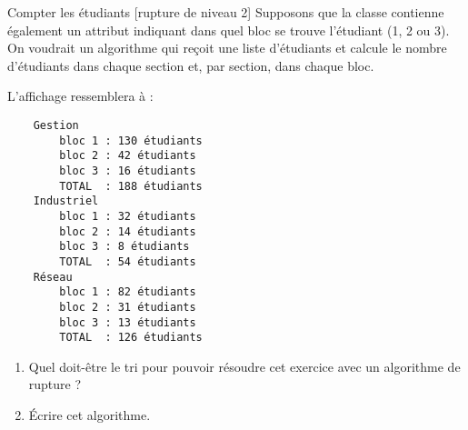 \begin{Exercice}{Compter les étudiants [rupture de niveau 2]}
	Supposons que la classe  contienne également
	un attribut indiquant dans quel bloc se trouve l'étudiant (1, 2 ou 3).
	On voudrait un algorithme qui reçoit une liste d'étudiants et calcule
	le nombre d'étudiants dans chaque section et, par section, dans chaque bloc.
	
	L'affichage ressemblera à :
	{\footnotesize
	\begin{verbatim}
    Gestion
        bloc 1 : 130 étudiants
        bloc 2 : 42 étudiants
        bloc 3 : 16 étudiants
        TOTAL  : 188 étudiants
    Industriel
        bloc 1 : 32 étudiants
        bloc 2 : 14 étudiants
        bloc 3 : 8 étudiants
        TOTAL  : 54 étudiants
    Réseau
        bloc 1 : 82 étudiants
        bloc 2 : 31 étudiants
        bloc 3 : 13 étudiants
        TOTAL  : 126 étudiants
	\end{verbatim}
	}
	\begin{enumerate}[label=\alph*)]
		\item 
		Quel doit-être le tri pour pouvoir résoudre cet exercice
		avec un algorithme de rupture ?
		\item 
		Écrire cet algorithme.
	\end{enumerate}
\end{Exercice}

\begin{Solution}
  \begin{algo}
\end{algo}
\end{Solution}
	

